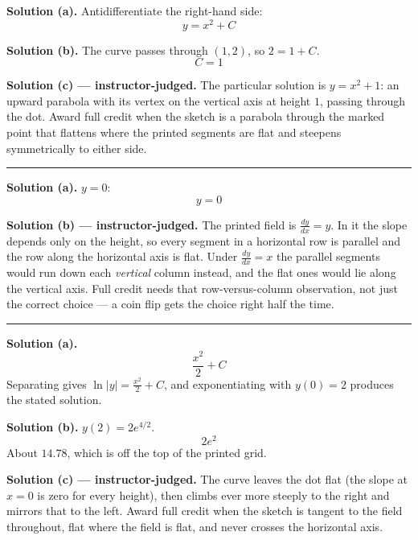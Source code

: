 \documentclass[12pt]{article}
\begin{document}

\textbf{Solution (a).} Antidifferentiate the right-hand side:
\[ \boxed{y = x^2 + C} \]

\textbf{Solution (b).} The curve passes through $(1,2)$, so $2 = 1 + C$.
\[ \boxed{C = 1} \]

\textbf{Solution (c) --- instructor-judged.} The particular solution is
$y = x^2 + 1$: an upward parabola with its vertex on the vertical axis at
height $1$, passing through the dot. Award full credit when the sketch is a
parabola through the marked point that flattens where the printed segments are
flat and steepens symmetrically to either side.

\vspace{0.15cm}\noindent\rule{\linewidth}{0.2pt}


\textbf{Solution (a).} $y = 0$:
\[ \boxed{y = 0} \]

\textbf{Solution (b) --- instructor-judged.} The printed field is
$\frac{dy}{dx} = y$. In it the slope depends only on the height, so every
segment in a horizontal row is parallel and the row along the horizontal axis is
flat. Under $\frac{dy}{dx} = x$ the parallel segments would run down each
\emph{vertical} column instead, and the flat ones would lie along the vertical
axis. Full credit needs that row-versus-column observation, not just the correct
choice --- a coin flip gets the choice right half the time.

\vspace{0.15cm}\noindent\rule{\linewidth}{0.2pt}


\textbf{Solution (a).}
\[ \boxed{\frac{x^2}{2} + C} \]
Separating gives $\ln|y| = \frac{x^2}{2} + C$, and exponentiating with
$y(0) = 2$ produces the stated solution.

\textbf{Solution (b).} $y(2) = 2e^{4/2}$.
\[ \boxed{2e^{2}} \]
About $14.78$, which is off the top of the printed grid.

\textbf{Solution (c) --- instructor-judged.} The curve leaves the dot flat (the
slope at $x = 0$ is zero for every height), then climbs ever more steeply to the
right and mirrors that to the left. Award full credit when the sketch is
tangent to the field throughout, flat where the field is flat, and never crosses
the horizontal axis.
\end{document}
